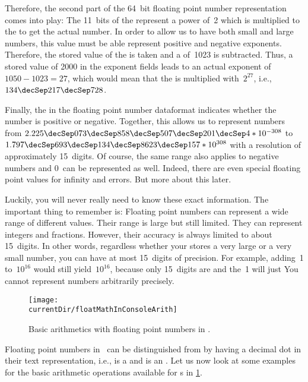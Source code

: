 Therefore, the second part of the 64~bit floating point number representation comes into play:
The 11~bits of the  represent a power of~2 which is multiplied to the  to get the actual number.
In order to allow us to have both small and large numbers, this value must be able represent positive and negative exponents.
Therefore, the stored value of the  is taken and a  of~1023 is subtracted.
Thus, a stored value of 2000 in the exponent fields leads to an actual exponent of $1050-1023=27$, which would mean that the  is multiplied with~$2^{27}$, i.e., $134\decSep217\decSep728$.%
%
\begin{sloppypar}%
Finally, the  in the floating point number dataformat indicates whether the number is positive or negative.
Together, this allows us to represent numbers from $2.225\decSep073\decSep858\decSep507\decSep201\decSep4*10^{-308}$ to $1.797\decSep693\decSep134\decSep8623\decSep157*10^{308}$ with a resolution of approximately 15~digits.
Of course, the same range also applies to negative numbers and $0$~can be represented as well.
Indeed, there are even special floating point values for infinity and errors.
But more about this later.%
\end{sloppypar}%
%
Luckily, you will never really need to know these exact information.
The important thing to remember is:
Floating point numbers can represent a wide range of different values.
Their range is large but still limited.
They can represent integers and fractions.
However, their accuracy is always limited to about 15~digits.
In other words, regardless whether your  stores a very large or a very small number, you can have at most 15~digits of precision.
For example, adding~1 to~$10^{16}$ would still yield~$10^{16}$, because only 15~digits are  and the~1 will just 
You cannot represent numbers arbitrarily precisely.%
\endhsection%
%
%
%
\begin{figure}%
\centering%
\texttt{[image: \\currentDir/floatMathInConsoleArith]}%
\caption{Basic arithmetics with floating point numbers in \python.}%
\label{fig:floatMathInConsoleArith}%
\end{figure}%
%
Floating point numbers in \python\ can be distinguished from  by having a decimal dot in their text representation, i.e.,  is a  and  is an .
Let us now look at some examples for the basic arithmetic operations available for s in \cref{fig:floatMathInConsoleArith}.

